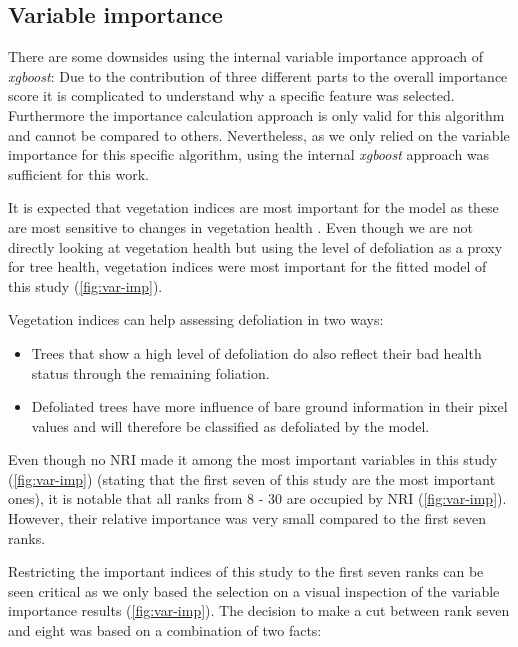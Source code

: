 \documentclass[review]{elsarticle}
\begin{document}
\subsection{Variable importance}

\noindent There are some downsides using the internal variable importance approach of \textit{xgboost}: Due to the contribution of three different parts to the overall importance score it is complicated to understand why a specific feature was selected.
Furthermore the importance calculation approach is only valid for this algorithm and cannot be compared to others.
Nevertheless, as we only relied on the variable importance for this specific algorithm, using the internal \textit{xgboost} approach was sufficient for this work.

It is expected that vegetation indices are most important for the model as these are most sensitive to changes in vegetation health \citep{croftApplicabilityEmpiricalVegetation2014}.
Even though we are not directly looking at vegetation health but using the level of defoliation as a proxy for tree health, vegetation indices were most important for the fitted model of this study (\autoref{fig:var-imp}).

\noindent Vegetation indices can help assessing defoliation in two ways:

\begin{itemize}
	\item Trees that show a high level of defoliation do also reflect their bad health status through the remaining foliation.
	\item Defoliated trees have more influence of bare ground information in their pixel values and will therefore be classified as defoliated by the model.
\end{itemize}

\noindent Even though no NRI made it among the most important variables in this study (\autoref{fig:var-imp}) (stating that the first seven of this study are the most important ones), it is notable that all ranks from 8 - 30 are occupied by NRI (\autoref{fig:var-imp}).
However, their relative importance was very small compared to the first seven ranks.

Restricting the important indices of this study to the first seven ranks can be seen critical as we only based the selection on a visual inspection of the variable importance results (\autoref{fig:var-imp}).
The decision to make a cut between rank seven and eight was based on a combination of two facts:
\end{document}
